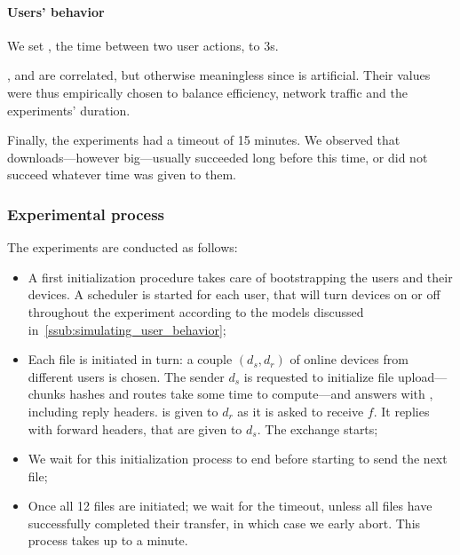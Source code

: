 \paragraph*{Users' behavior} We set \tuser, the time between two user actions, to 3s. 

\trps, \tupload and \tuser are correlated, but otherwise meaningless since \tuser is artificial. 
Their values were thus empirically chosen to balance efficiency, network traffic and the experiments' duration.

Finally, the experiments had a timeout \texp of 15 minutes. 
We observed that downloads---however big---usually succeeded long before this time, or did not succeed whatever time was given to them.


\subsubsection{Experimental process} %
\label{ssub:experimental_process}

The experiments are conducted as follows: 
\begin{itemize}
  \item A first initialization procedure takes care of bootstrapping the users and their devices. 
  A scheduler is started for each user, that will turn devices on or off throughout the experiment according to the models discussed in~\ref{ssub:simulating_user_behavior};
  \item Each file is initiated in turn: a couple $(d_s, d_r)$ of online devices from different users is chosen.
  The sender $d_s$ is requested to initialize file upload---chunks hashes and routes take some time to compute---and answers with \finfo, including reply headers. 
  \finfo is given to $d_r$ as it is asked to receive $f$. It replies with forward headers, that are given to $d_s$. The exchange starts;
  \item We wait for this initialization process to end before starting to send the next file;
  \item Once all 12 files are initiated; we wait for the \texp timeout, unless all files have successfully completed their transfer, 
  in which case we early abort. This process takes up to a minute.
\end{itemize}


